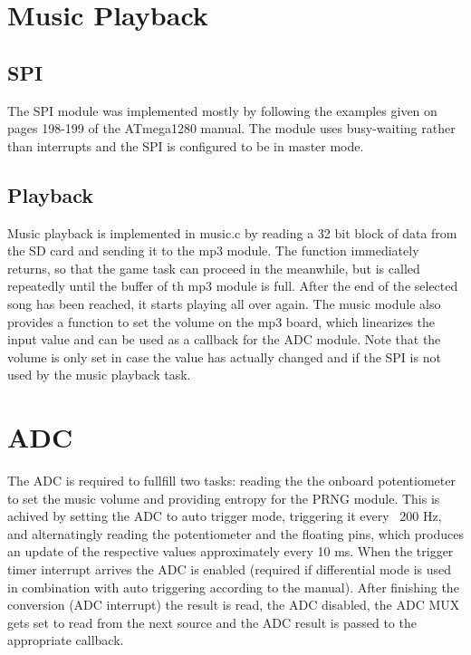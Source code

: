 \documentclass[12pt,a4paper,titlepage,oneside]{article}
\begin{document}
\section{Music Playback}

\subsection{SPI}

The SPI module was implemented mostly by following the examples given on
pages 198-199 of the ATmega1280 manual. The module uses busy-waiting rather
than interrupts and the SPI is configured to be in master mode.

\subsection{Playback}

Music playback is implemented in music.c by reading a 32 bit block of data from the SD 
card and sending it to the mp3 module. The function immediately returns, so
that the game task can proceed in the meanwhile, but is called repeatedly
until the buffer of th mp3 module is full. After the end of the selected song
has been reached, it starts playing all over again. The music module also 
provides a function to set the volume on the mp3 board, which linearizes the
input value and can be used as a callback for the ADC module. Note that the
volume is only set in case the value has actually changed and if the SPI is not
used by the music playback task.

\section{ADC}

The ADC is required to fullfill two tasks: reading the the onboard
potentiometer to set the music volume and providing entropy for the PRNG
module. This is achived by setting the ADC to auto trigger mode, triggering
it every ~200 Hz, and alternatingly reading the potentiometer and the floating
pins, which produces an update of the respective values approximately every
10 ms. When the trigger timer interrupt arrives the ADC is enabled (required
if differential mode is used in combination with auto triggering according
to the manual). After finishing the conversion (ADC interrupt) the result
is read, the ADC disabled, the ADC MUX gets set to read from the next source
and the ADC result is passed to the appropriate callback.
\end{document}

